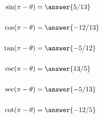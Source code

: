 \documentclass{ximera}
\begin{document}
\begin{exercise}
\begin{exercise}
\begin{exercise}
			\begin{exercise}
				\begin{align*}
					\sin(\pi-\theta) &= \answer{5/13}\\
					\\
					\cos(\pi-\theta) &= \answer{-12/13}\\
					\\
					\tan(\pi-\theta) &= \answer{-5/12}\\
					\\
					\csc(\pi-\theta) &= \answer{13/5}\\
					\\
					\sec(\pi-\theta) &= \answer{-5/13}\\
					\\
					\cot(\pi-\theta) &= \answer{-12/5}\\
				\end{align*}
			\end{exercise}
		\end{exercise}
	\end{exercise}
\end{exercise}
\end{document}
